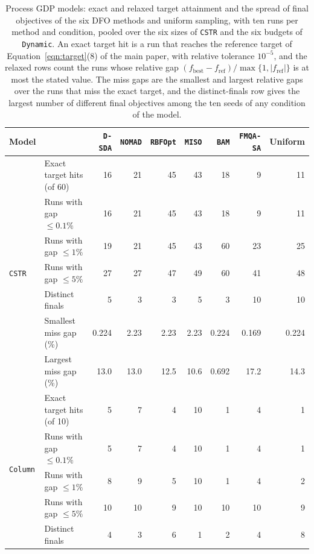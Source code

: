 \begin{table}[htbp]
\centering
\caption{Process GDP models: exact and relaxed target attainment and the spread of final objectives of the six DFO methods and uniform sampling, with ten runs per method and condition, pooled over the six sizes of \texttt{CSTR} and the six budgets of \texttt{Dynamic}.
An exact target hit is a run that reaches the reference target of Equation~\ifdefined\manuscriptwithsupplement\eqref{eqn:target}\else(8)\fi{} of the main paper, with relative tolerance \(10^{-5}\), and the relaxed rows count the runs whose relative gap \((f_{\mathrm{best}}-f_{\mathrm{ref}})/\max\{1,|f_{\mathrm{ref}}|\}\) is at most the stated value.
The miss gaps are the smallest and largest relative gaps over the runs that miss the exact target, and the distinct-finals row gives the largest number of different final objectives among the ten seeds of any condition of the model.}
\label{tab:supp-spread}
\footnotesize
\setlength{\tabcolsep}{3.5pt}
\begin{threeparttable}
\begin{tabular}{@{}llrrrrrrr@{}}\toprule
Model & & \texttt{D-SDA} & \texttt{NOMAD} & \texttt{RBFOpt} & \texttt{MISO} & \texttt{BAM} & \texttt{FMQA-SA} & Uniform\\\midrule
\multirow{7}{*}{\texttt{CSTR}} & Exact target hits (of 60) & 16 & 21 & 45 & 43 & 18 & 9 & 11 \\
 & Runs with gap \(\leq0.1\%\) & 16 & 21 & 45 & 43 & 18 & 9 & 11 \\
 & Runs with gap \(\leq1\%\) & 19 & 21 & 45 & 43 & 60 & 23 & 25 \\
 & Runs with gap \(\leq5\%\) & 27 & 27 & 47 & 49 & 60 & 41 & 48 \\
 & Distinct finals & 5 & 3 & 3 & 5 & 3 & 10 & 10 \\
 & Smallest miss gap (\%) & 0.224 & 2.23 & 2.23 & 2.23 & 0.224 & 0.169 & 0.224 \\
 & Largest miss gap (\%) & 13.0 & 13.0 & 12.5 & 10.6 & 0.692 & 17.2 & 14.3 \\
\midrule
\multirow{7}{*}{\texttt{Column}} & Exact target hits (of 10) & 5 & 7 & 4 & 10 & 1 & 4 & 1 \\
 & Runs with gap \(\leq0.1\%\) & 5 & 7 & 4 & 10 & 1 & 4 & 1 \\
 & Runs with gap \(\leq1\%\) & 8 & 9 & 5 & 10 & 1 & 4 & 2 \\
 & Runs with gap \(\leq5\%\) & 10 & 10 & 9 & 10 & 10 & 10 & 9 \\
 & Distinct finals & 4 & 3 & 6 & 1 & 2 & 4 & 8 \\

\end{tabular}
\end{threeparttable}
\end{table}
